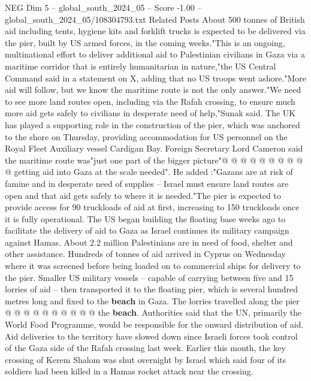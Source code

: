 \begin{textsample}{NEG Dim 5 – global\_south\_2024\_05 – Score -1.00 – global\_south\_2024\_05/108304793.txt}  \label{ex:f5_neg_386}
Related Posts About 500 tonnes of British aid including tents, hygiene kits and forklift trucks is expected to be delivered via the pier, built by US armed forces, in the coming weeks."This is an ongoing, multinational effort to deliver additional aid to Palestinian civilians in Gaza via a maritime corridor that is entirely humanitarian in nature,"the US Central Command said in a statement on X, adding that no US troops went ashore."More aid will follow, but we know the maritime route is not the only answer."We need to see more land routes open, including via the Rafah crossing, to ensure much more aid gets safely to civilians in desperate need of help,"Sunak said.
The UK has played a supporting role in the construction of the pier, which was anchored to the shore on Thursday, providing accommodation for US personnel on the Royal Fleet Auxiliary vessel Cardigan Bay.
Foreign Secretary Lord Cameron said the maritime route was"just one part of the bigger picture"@ @ @ @ @ @ @ @ @ @ getting aid into Gaza at the scale needed".
He added :"Gazans are at risk of famine and in desperate need of supplies -- Israel must ensure land routes are open and that aid gets safely to where it is needed."The pier is expected to provide access for 90 truckloads of aid at first, increasing to 150 truckloads once it is fully operational.
The US began building the floating base weeks ago to facilitate the delivery of aid to Gaza as Israel continues its military campaign against Hamas.
About 2.2 million Palestinians are in need of food, shelter and other assistance.
Hundreds of tonnes of aid arrived in Cyprus on Wednesday where it was screened before being loaded on to commercial ships for delivery to the pier.
Smaller US military vessels -- capable of carrying between five and 15 lorries of aid -- then transported it to the floating pier, which is several hundred metres long and fixed to the \textbf{beach} in Gaza.
The lorries travelled along the pier @ @ @ @ @ @ @ @ @ @ the \textbf{beach}.
Authorities said that the UN, primarily the World Food Programme, would be responsible for the onward distribution of aid.
Aid deliveries to the territory have slowed down since Israeli forces took control of the Gaza side of the Rafah crossing last week.
Earlier this month, the key crossing of Kerem Shalom was shut overnight by Israel which said four of its soldiers had been killed in a Hamas rocket attack near the crossing.

\end{textsample}
